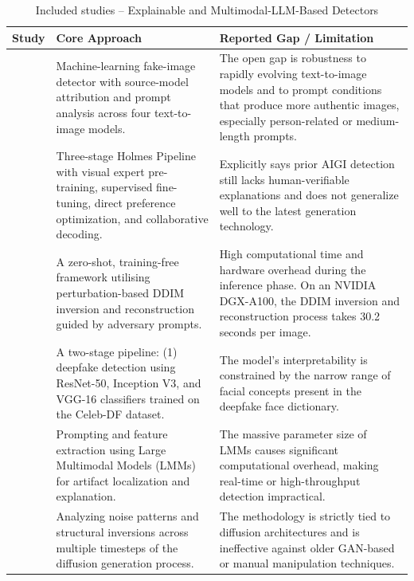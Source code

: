 \documentclass[sn-mathphys-num,Numbered,pdflatex]{sn-jnl}
\begin{document}
\begin{table}[htbp]
\caption{Included studies -- Explainable and Multimodal-LLM-Based Detectors}
\label{tab:explainable_mllm}
\centering\footnotesize
\begin{tabularx}{\columnwidth}{@{}p{} X X@{}}
\toprule
\textbf{Study} & \textbf{Core Approach} & \textbf{Reported Gap / Limitation} \\
\midrule
\cite{DefakeDetection12} & Machine-learning fake-image detector with source-model attribution and prompt analysis across four text-to-image models. & The open gap is robustness to rapidly evolving text-to-image models and to prompt conditions that produce more authentic images, especially person-related or medium-length prompts. \\
\cite{AigiholmesTowards13} & Three-stage Holmes Pipeline with visual expert pre-training, supervised fine-tuning, direct preference optimization, and collaborative decoding. & Explicitly says prior AIGI detection still lacks human-verifiable explanations and does not generalize well to the latest generation technology. \\
\cite{ZerofakeZeroshot47} & A zero-shot, training-free framework utilising perturbation-based DDIM inversion and reconstruction guided by adversary prompts. & High computational time and hardware overhead during the inference phase. On an NVIDIA DGX-A100, the DDIM inversion and reconstruction process takes 30.2 seconds per image. \\
\cite{ExplainableAi48} & A two-stage pipeline: (1) deepfake detection using ResNet-50, Inception V3, and VGG-16 classifiers trained on the Celeb-DF dataset. & The model's interpretability is constrained by the narrow range of facial concepts present in the deepfake face dictionary. \\
\cite{SpotThe58} & Prompting and feature extraction using Large Multimodal Models (LMMs) for artifact localization and explanation. & The massive parameter size of LMMs causes significant computational overhead, making real-time or high-throughput detection impractical. \\
\cite{ExplainableSynthetic59} & Analyzing noise patterns and structural inversions across multiple timesteps of the diffusion generation process. & The methodology is strictly tied to diffusion architectures and is ineffective against older GAN-based or manual manipulation techniques. \\
\bottomrule
\end{tabularx}
\end{table}
\FloatBarrier
\end{document}
